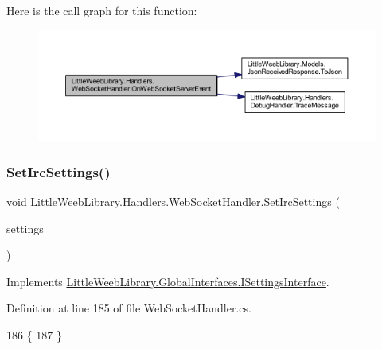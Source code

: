Here is the call graph for this function\+:\nopagebreak
\begin{figure}[H]
\begin{center}
\leavevmode
\includegraphics[width=350pt]{class_little_weeb_library_1_1_handlers_1_1_web_socket_handler_a527c7515f2e19938e9ff23ce2d993fda_cgraph}
\end{center}
\end{figure}
\mbox{\label{class_little_weeb_library_1_1_handlers_1_1_web_socket_handler_a9c13ff9ec9ed3dfc07235f47332276d1}} 
\subsubsection{\texorpdfstring{Set\+Irc\+Settings()}{SetIrcSettings()}}
{\footnotesize\ttfamily void Little\+Weeb\+Library.\+Handlers.\+Web\+Socket\+Handler.\+Set\+Irc\+Settings (\begin{DoxyParamCaption}\item[{\mbox{\hyperlink{class_little_weeb_library_1_1_settings_1_1_irc_settings}{Irc\+Settings}}}]{settings }\end{DoxyParamCaption})}



Implements \mbox{\hyperlink{interface_little_weeb_library_1_1_global_interfaces_1_1_i_settings_interface_a9ddf06e247a96d757482b37ddb070e3d}{Little\+Weeb\+Library.\+Global\+Interfaces.\+I\+Settings\+Interface}}.



Definition at line 185 of file Web\+Socket\+Handler.\+cs.


\begin{DoxyCode}
186         \{
187         \}
\end{DoxyCode}


